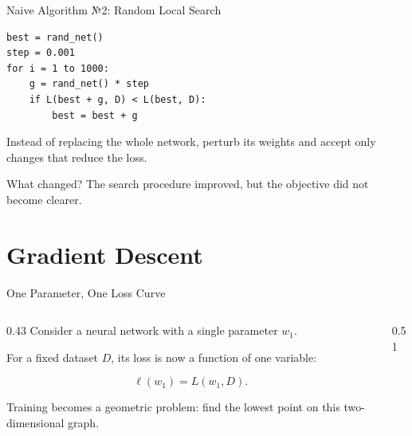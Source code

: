 \documentclass[aspectratio=169]{beamer}
\begin{document}
\begin{frame}[fragile]{{\normalsize Naive Algorithm №2: Random Local Search}}
  \small
\begin{verbatim}
best = rand_net()
step = 0.001
for i = 1 to 1000:
    g = rand_net() * step
    if L(best + g, D) < L(best, D):
        best = best + g
\end{verbatim}

  Instead of replacing the whole network, perturb its weights and accept only
  changes that reduce the loss.

  \begin{alertblock}{What changed?}
    The search procedure improved, but the objective did not become clearer.
  \end{alertblock}
\end{frame}

\section{Gradient Descent}

\begin{frame}{One Parameter, One Loss Curve}
  \begin{columns}[c]
    \begin{column}{0.43\textwidth}
      Consider a neural network with a single parameter $w_1$.

      For a fixed dataset $D$, its loss is now a function of one variable:

      \begin{equation*}
        \ell(w_1) = L(w_1, D).
      \end{equation*}

      Training becomes a geometric problem: find the lowest point on this
      two-dimensional graph.
    \end{column}
    \begin{column}{0.51\textwidth}
      \centering
    \end{column}
  \end{columns}
\end{frame}
\end{document}
